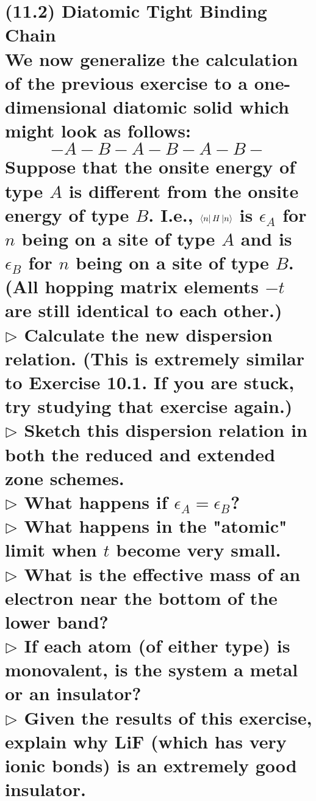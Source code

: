 \documentclass[reqno,a4paper,12pt]{amsart}
\begin{document}
\section{\textbf{(11.2) Diatomic Tight Binding Chain} \\
We now generalize the calculation of the previous exercise to a one-dimensional diatomic solid which might look as follows: 
\[
	-A-B-A-B-A-B-
\]
Suppose that the onsite energy of type $A$ is different from the onsite energy of type $B$. I.e., $\bra{n}H\ket{n}$ is $\epsilon_A$ for $n$ being on a site of type $A$ and is $\epsilon_B$ for $n$ being on a site of type $B$. (All hopping matrix elements $-t$ are still identical to each other.) \\
$\triangleright$ Calculate the new dispersion relation. (This is extremely similar to Exercise 10.1. If you are stuck, try studying that exercise again.) \\
$\triangleright$ Sketch this dispersion relation in both the reduced and extended zone schemes. \\
$\triangleright$ What happens if $\epsilon_A = \epsilon_B$? \\
$\triangleright$ What happens in the "atomic" limit when $t$ become very small. \\
$\triangleright$ What is the effective mass of an electron near the bottom of the lower band? \\
$\triangleright$ If each atom (of either type) is monovalent, is the system a metal or an insulator? \\
$\triangleright$ Given the results of this exercise, explain why LiF (which has very ionic bonds) is an extremely good insulator.
}
\end{document}
